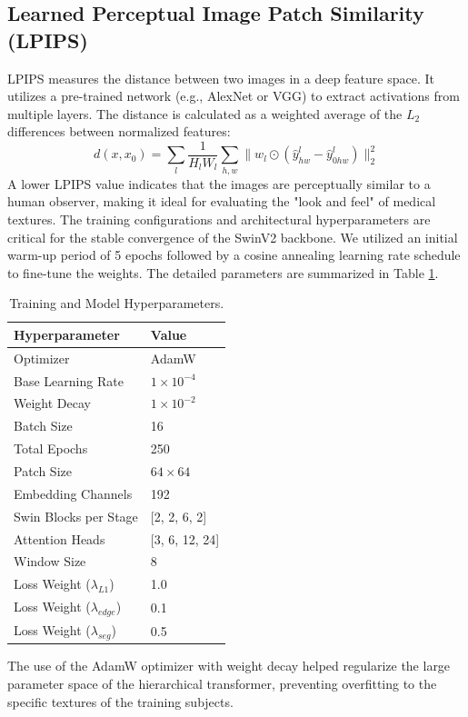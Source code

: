 \subsection{Learned Perceptual Image Patch Similarity (LPIPS)}
LPIPS measures the distance between two images in a deep feature space. It utilizes a pre-trained network (e.g., AlexNet or VGG) to extract activations from multiple layers. The distance is calculated as a weighted average of the $L_2$ differences between normalized features:
\begin{equation}
    d(x, x_0) = \sum_l \frac{1}{H_l W_l} \sum_{h,w} \| w_l \odot (\hat{y}_{hw}^l - \hat{y}_{0hw}^l) \|_2^2
\end{equation}
A lower LPIPS value indicates that the images are perceptually similar to a human observer, making it ideal for evaluating the "look and feel" of medical textures.
The training configurations and architectural hyperparameters are critical for the stable convergence of the SwinV2 backbone. We utilized an initial warm-up period of 5 epochs followed by a cosine annealing learning rate schedule to fine-tune the weights. The detailed parameters are summarized in Table \ref{tab:hyperparameters}.

\begin{table}[H]
    \centering
    \caption{Training and Model Hyperparameters.}
    \label{tab:hyperparameters}
    \begin{tabular}{ll}
        \toprule
        \textbf{Hyperparameter} & \textbf{Value} \\
        \midrule
        Optimizer & AdamW \\
        Base Learning Rate & $1 \times 10^{-4}$ \\
        Weight Decay & $1 \times 10^{-2}$ \\
        Batch Size & 16 \\
        Total Epochs & 250 \\
        Patch Size & $64 \times 64$ \\
        Embedding Channels & 192 \\
        Swin Blocks per Stage & [2, 2, 6, 2] \\
        Attention Heads & [3, 6, 12, 24] \\
        Window Size & 8 \\
        Loss Weight ($\lambda_{L1}$) & 1.0 \\
        Loss Weight ($\lambda_{edge}$) & 0.1 \\
        Loss Weight ($\lambda_{seg}$) & 0.5 \\
        \bottomrule
    \end{tabular}
\end{table}
The use of the AdamW optimizer with weight decay helped regularize the large parameter space of the hierarchical transformer, preventing overfitting to the specific textures of the training subjects.
